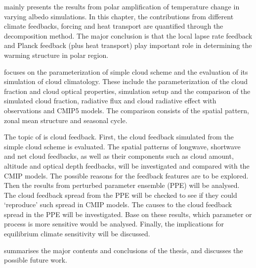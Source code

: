  mainly presents the results from polar amplification of temperature change in varying albedo simulations. In this chapter, the contributions from different climate feedbacks, forcing and heat transport are quantified through the decomposition method. The major conclusion is that the local lapse rate feedback and Planck feedback (plus heat transport) play important role in determining the warming structure in polar region.

 focuses on the parameterization of simple cloud scheme and the evaluation of its simulation of cloud climatology. These include the parameterization of the cloud fraction and cloud optical properties, simulation setup and the comparison of the simulated cloud fraction, radiative flux and cloud radiative effect with observations and CMIP5 models. The comparison consists of the spatial pattern, zonal mean structure and seasonal cycle. %

The topic of  is cloud feedback. First, the cloud feedback simulated from the simple cloud scheme is evaluated. The spatial patterns of longwave, shortwave and net cloud feedbacks, as well as their components such as cloud amount, altitude and optical depth feedbacks, will be investigated and compared with the CMIP models. The possible reasons for the feedback features are to be explored. Then the results from perturbed parameter ensemble (PPE) will be analysed. The cloud feedback spread from the PPE will be checked to see if they could `reproduce' such spread in CMIP models. The causes to the cloud feedback spread in the PPE will be investigated. Base on these results, which parameter or process is more sensitive would be analysed. Finally, the implications for equilibrium climate sensitivity will be discussed.

 summarises the major contents and conclusions of the thesis, and discusses the possible future work.

